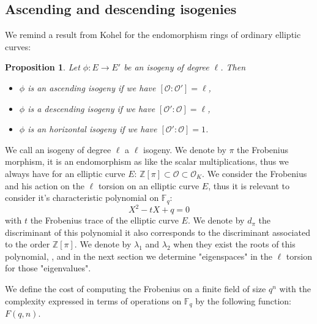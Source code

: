 \documentclass{lms}
\newtheorem{prop}[thm]{Proposition}
\begin{document}
\subsection{Ascending and descending isogenies}
We remind a result from Kohel \cite{Kohel} for the endomorphism rings of ordinary elliptic curves:
\begin{prop}
Let $\phi:E \rightarrow E'$ be an isogeny of degree $\ell$. Then 
\begin{itemize}
\item $\phi$ is an ascending isogeny if we have $[\mathcal{O}:\mathcal{O'}]=\ell$,
\item $\phi$ is a descending isogeny if we have $[\mathcal{O'}:\mathcal{O}]=\ell$,
\item $\phi$ is an horizontal isogeny if we have $[\mathcal{O'}:\mathcal{O}]=1$.
\end{itemize}
\end{prop}
We call an isogeny of degree $\ell$ a $\ell$ isogeny.
We denote by $\pi$ the Frobenius morphism, it is an endomorphism as like the scalar multiplications, thus we always have for an elliptic curve $E$:
$\mathbb{Z}[\pi] \subset \mathcal{O} \subset \mathcal{O}_K$.
We consider the Frobenius and his action on the $\ell$ torsion on an elliptic curve $E$, thus it is relevant to consider it's characteristic polynomial on $\mathbb{F}_q$:
\begin{equation}
X^2 - tX +q = 0
\end{equation}
with $t$ the Frobenius trace of the elliptic curve $E$. We denote by $d_{\pi}$ the discriminant of this polynomial it also corresponds to the discriminant associated to the order $\mathbb{Z}[\pi]$. We denote by $\lambda_1$ and $\lambda_2$ when they exist the roots of this polynomial, , and in the next section we  determine "eigenspaces" in the $\ell$ torsion for those "eigenvalues".

\begin{defi}
We define the cost of computing the Frobenius on a finite field of size $q^n$ with the complexity expressed in terms of operations on $\mathbb{F}_q$ by the following function: $F(q,n)$.
\end{defi}
\end{document}
